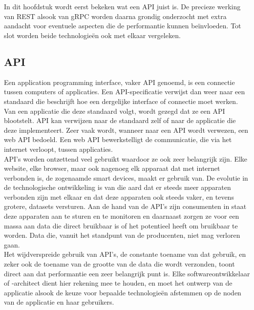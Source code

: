 \chapter{}%
\label{ch:stand-van-zaken}

\nocite{Paper}

In dit hoofdstuk wordt eerst bekeken wat een API juist is. De precieze werking van REST alsook van gRPC worden daarna grondig onderzocht met extra aandacht voor
eventuele aspecten die de performantie kunnen beïnvloeden. Tot slot worden beide technologie\"en ook met elkaar vergeleken.

\section{API}

Een application programming interface, vaker API genoemd, is een connectie tussen computers of applicaties.
Een API-specificatie verwijst dan weer naar een standaard die beschrijft hoe een dergelijke interface of connectie moet werken.
Van een applicatie die deze standaard volgt, wordt gezegd dat ze een API blootstelt. API kan verwijzen naar de standaard zelf of naar de applicatie die deze implementeert.
Zeer vaak wordt, wanneer naar een API wordt verwezen, een web API bedoeld. Een web API bewerkstelligt de communicatie, die via het internet verloopt, tussen applicaties.\\

API's worden ontzettend veel gebruikt waardoor ze ook zeer belangrijk zijn. Elke website, elke browser, maar ook nagenoeg elk apparaat dat met internet verbonden is,
de zogenaamde smart devices, maakt er gebruik van. De evolutie in de technologische ontwikkeling is van die aard dat er steeds meer apparaten verbonden zijn met elkaar
en dat deze apparaten ook steeds vaker, en tevens grotere, datasets versturen. Aan de hand van de API's zijn consumenten in staat deze apparaten aan te sturen en te monitoren
en daarnaast zorgen ze voor een massa aan data die direct bruikbaar is of het potentieel heeft om bruikbaar te worden. Data die, vanuit het standpunt van de producenten, niet mag verloren gaan.\\

Het wijdverspreide gebruik van API's, de constante toename van dat gebruik, en zeker ook de toename van de grootte van de data die wordt verzonden, toont
direct aan dat performantie een zeer belangrijk punt is. Elke softwareontwikkelaar of -architect dient hier rekening mee te houden, en moet het ontwerp van de
applicatie alsook de keuze voor bepaalde technologie\"en afstemmen op de noden van de applicatie en haar gebruikers.\newline
~\autocite{cleo}\\

